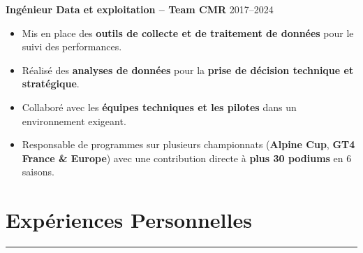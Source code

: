 \documentclass[a4paper,12pt]{article}
\newcommand{\sectionrule}[1]{%
\section*{#1}%
\vspace{-1em}%
\noindent\rule{\linewidth}{1pt}%
\vspace{0.5em}%
}
\begin{document}
\begin{paracol}{2}
\begin{rightcolumn}
\begin{minipage}[t][\dimexpr\textheight - 9em\relax][t]{\dimexpr\linewidth - 1.5em\relax}
{\textbf{Ingénieur Data et exploitation – Team CMR} \hfill {\color{blue}2017–2024}  
\begin{itemize}[leftmargin=1em, nosep]
  \vspace{0.2em}
  \item Mis en place des \textbf{outils de collecte et de traitement de données} pour le suivi des performances.
  \vspace{0.2em}
  \item Réalisé des \textbf{analyses de données} pour la \textbf{prise de décision technique et stratégique}.
  \vspace{0.2em}
  \item Collaboré avec les \textbf{équipes techniques et les pilotes} dans un environnement exigeant.
  \vspace{0.2em}
  \item Responsable de programmes sur plusieurs championnats (\textbf{Alpine Cup}, \textbf{GT4 France \& Europe}) avec une contribution directe à \textbf{plus 30 podiums} en 6 saisons.
\end{itemize}








\vspace{0.5em}
\sectionrule{Expériences Personnelles}

}
\end{minipage}
\end{rightcolumn}
\end{paracol}
\end{document}
